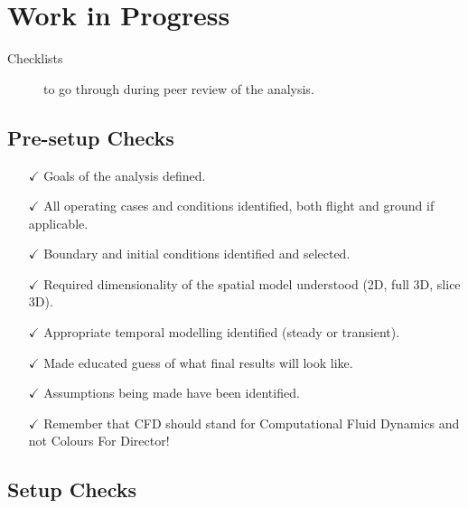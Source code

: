 \section*{Work in Progress}

\begin{description}
    \item[Checklists] to go through during peer review of the analysis.
\end{description}

\subsection*{Pre-setup Checks}
\begin{itemize}
    \item[$\checkmark$] Goals of the analysis defined.
    \item[$\checkmark$] All operating cases and conditions identified, both flight and ground if applicable.
    \item[$\checkmark$] Boundary and initial conditions identified and selected.
    \item[$\checkmark$] Required dimensionality of the spatial model understood (2D, full 3D, slice 3D).
    \item[$\checkmark$] Appropriate temporal modelling identified (steady or transient).
    \item[$\checkmark$] Made educated guess of what final results will look like.
    \item[$\checkmark$] Assumptions being made have been identified.
    \item[$\checkmark$] Remember that CFD should stand for Computational Fluid Dynamics and not Colours For Director!
\end{itemize}

\subsection*{Setup Checks}

